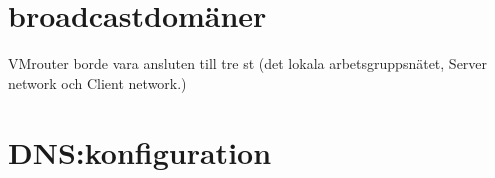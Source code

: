 \documentclass[swedish,11pt,a4paper]{article}
\begin{document}
    \section{broadcastdomäner}
    \label{sec:broadcastdomains}

    VMrouter borde vara ansluten till tre st (det lokala arbetsgruppsnätet, Server network och Client network.)

    \section{DNS:konfiguration}
    \label{sec:dns_konf}








\end{document}
